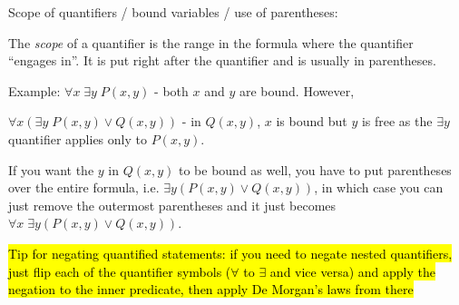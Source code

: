\documentclass{article}
\begin{document}
\begin{description}
	\item \qquad Scope of quantifiers / bound variables / use of parentheses: 
	\begin{description}
		\item \qquad The \emph{scope} of a quantifier is the range in the formula where the quantifier ``engages in''. It is put right after the quantifier and is usually in parentheses.
		\item \qquad Example: $\forall x\; \exists y\; P(x,y)$ - both $x$ and $y$ are bound. However,
		\item \qquad $\forall x(\exists y\; P(x,y) \lor Q(x,y))$ - in $Q(x,y)$, $x$ is bound but $y$ is free as the $\exists y$ quantifier applies only to $P(x, y)$. 
		\item \qquad If you want the $y$ in $Q(x,y)$ to be bound as well, you have to put parentheses over the entire formula, i.e. $\exists y(P(x,y) \lor Q(x, y))$, in which case you can just remove the outermost parentheses and it just becomes $\forall x\; \exists y(P(x,y) \lor Q(x,y))$.
	\end{description}
	\item \hl{Tip for negating quantified statements: if you need to negate nested quantifiers, just flip each of the quantifier symbols ($\forall$ to $\exists$ and vice versa) and apply the negation to the inner predicate, then apply De Morgan's laws from there}


\end{description}
\end{document}
